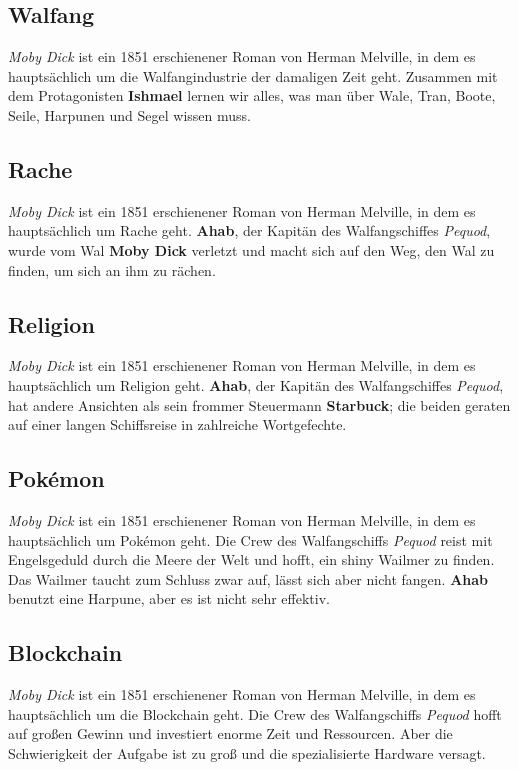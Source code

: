 \documentclass[a5paper,9pt,twoside=false]{extbook}
\begin{document}
\subsection*{Walfang}
\textit{Moby Dick} ist ein 1851 erschienener Roman von Herman Melville, in dem es hauptsächlich um die Walfangindustrie der damaligen Zeit geht. Zusammen mit dem Protagonisten \textbf{Ishmael} lernen wir alles, was man über Wale, Tran, Boote, Seile, Harpunen und Segel wissen muss.

\medskip

\subsection*{Rache}
\textit{Moby Dick} ist ein 1851 erschienener Roman von Herman Melville, in dem es hauptsächlich um Rache geht. \textbf{Ahab}, der Kapitän des Walfangschiffes \textit{Pequod}, wurde vom Wal \textbf{Moby Dick} verletzt und macht sich auf den Weg, den Wal zu finden, um sich an ihm zu rächen.

\medskip

\subsection*{Religion}
\textit{Moby Dick} ist ein 1851 erschienener Roman von Herman Melville, in dem es hauptsächlich um Religion geht. \textbf{Ahab}, der Kapitän des Walfangschiffes \textit{Pequod}, hat andere Ansichten als sein frommer Steuermann \textbf{Starbuck}; die beiden geraten auf einer langen Schiffsreise in zahlreiche Wortgefechte.

\medskip

\subsection*{Pokémon}
\textit{Moby Dick} ist ein 1851 erschienener Roman von Herman Melville, in dem es hauptsächlich um Pokémon geht. Die Crew des Walfangschiffs \textit{Pequod} reist mit Engelsgeduld durch die Meere der Welt und hofft, ein shiny Wailmer zu finden. Das Wailmer taucht zum Schluss zwar auf, lässt sich aber nicht fangen. \textbf{Ahab} benutzt eine Harpune, aber es ist nicht sehr effektiv. 

\medskip

\subsection*{Blockchain}
\textit{Moby Dick} ist ein 1851 erschienener Roman von Herman Melville, in dem es hauptsächlich um die Blockchain geht. Die Crew des Walfangschiffs \textit{Pequod} hofft auf großen Gewinn und investiert enorme Zeit und Ressourcen. Aber die Schwierigkeit der Aufgabe ist zu groß und die spezialisierte Hardware versagt.
\end{document}

